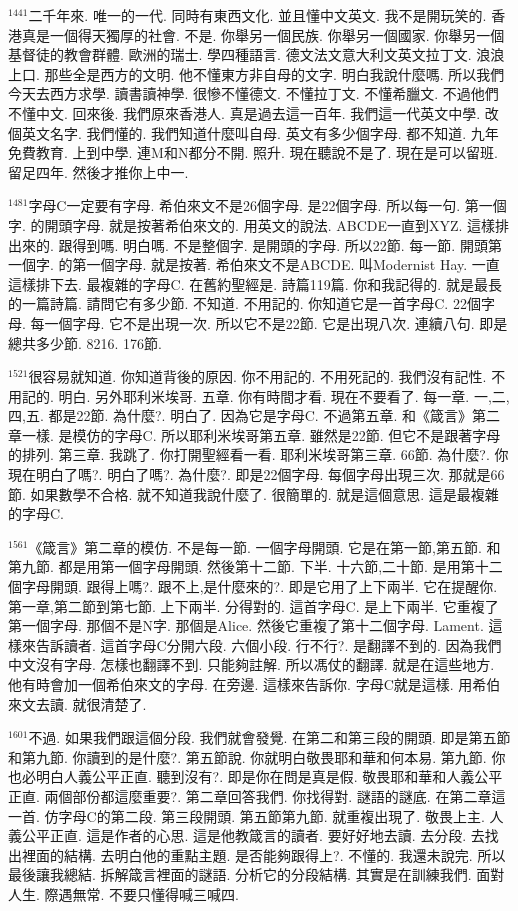 \documentclass{book}
\begin{document}
$^{1441}$二千年來.
唯一的一代.
同時有東西文化.
並且懂中文英文.
我不是開玩笑的.
香港真是一個得天獨厚的社會.
不是.
你舉另一個民族.
你舉另一個國家.
你舉另一個基督徒的教會群體.
歐洲的瑞士.
學四種語言.
德文法文意大利文英文拉丁文.
浪浪上口.
那些全是西方的文明.
他不懂東方非自母的文字.
明白我說什麼嗎.
所以我們今天去西方求學.
讀書讀神學.
很慘不懂德文.
不懂拉丁文.
不懂希臘文.
不過他們不懂中文.
回來後.
我們原來香港人.
真是過去這一百年.
我們這一代英文中學.
改個英文名字.
我們懂的.
我們知道什麼叫自母.
英文有多少個字母.
都不知道.
九年免費教育.
上到中學.
連M和N都分不開.
照升.
現在聽說不是了.
現在是可以留班.
留足四年.
然後才推你上中一.

$^{1481}$字母C一定要有字母.
希伯來文不是26個字母.
是22個字母.
所以每一句.
第一個字.
的開頭字母.
就是按著希伯來文的.
用英文的說法.
ABCDE一直到XYZ.
這樣排出來的.
跟得到嗎.
明白嗎.
不是整個字.
是開頭的字母.
所以22節.
每一節.
開頭第一個字.
的第一個字母.
就是按著.
希伯來文不是ABCDE.
叫Modernist Hay.
一直這樣排下去.
最複雜的字母C.
在舊約聖經是.
詩篇119篇.
你和我記得的.
就是最長的一篇詩篇.
請問它有多少節.
不知道.
不用記的.
你知道它是一首字母C.
22個字母.
每一個字母.
它不是出現一次.
所以它不是22節.
它是出現八次.
連續八句.
即是總共多少節.
8216.
176節.

$^{1521}$很容易就知道.
你知道背後的原因.
你不用記的.
不用死記的.
我們沒有記性.
不用記的.
明白.
另外耶利米埃哥.
五章.
你有時間才看.
現在不要看了.
每一章.
一,二,四,五.
都是22節.
為什麼?.
明白了.
因為它是字母C.
不過第五章.
和《箴言》第二章一樣.
是模仿的字母C.
所以耶利米埃哥第五章.
雖然是22節.
但它不是跟著字母的排列.
第三章.
我跳了.
你打開聖經看一看.
耶利米埃哥第三章.
66節.
為什麼?.
你現在明白了嗎?.
明白了嗎?.
為什麼?.
即是22個字母.
每個字母出現三次.
那就是66節.
如果數學不合格.
就不知道我說什麼了.
很簡單的.
就是這個意思.
這是最複雜的字母C.

$^{1561}$《箴言》第二章的模仿.
不是每一節.
一個字母開頭.
它是在第一節,第五節.
和第九節.
都是用第一個字母開頭.
然後第十二節.
下半.
十六節,二十節.
是用第十二個字母開頭.
跟得上嗎?.
跟不上,是什麼來的?.
即是它用了上下兩半.
它在提醒你.
第一章,第二節到第七節.
上下兩半.
分得對的.
這首字母C.
是上下兩半.
它重複了第一個字母.
那個不是N字.
那個是Alice.
然後它重複了第十二個字母.
Lament.
這樣來告訴讀者.
這首字母C分開六段.
六個小段.
行不行?.
是翻譯不到的.
因為我們中文沒有字母.
怎樣也翻譯不到.
只能夠註解.
所以馮仗的翻譯.
就是在這些地方.
他有時會加一個希伯來文的字母.
在旁邊.
這樣來告訴你.
字母C就是這樣.
用希伯來文去讀.
就很清楚了.

$^{1601}$不過.
如果我們跟這個分段.
我們就會發覺.
在第二和第三段的開頭.
即是第五節和第九節.
你讀到的是什麼?.
第五節說.
你就明白敬畏耶和華和何本易.
第九節.
你也必明白人義公平正直.
聽到沒有?.
即是你在問是真是假.
敬畏耶和華和人義公平正直.
兩個部份都這麼重要?.
第二章回答我們.
你找得對.
謎語的謎底.
在第二章這一首.
仿字母C的第二段.
第三段開頭.
第五節第九節.
就重複出現了.
敬畏上主.
人義公平正直.
這是作者的心思.
這是他教箴言的讀者.
要好好地去讀.
去分段.
去找出裡面的結構.
去明白他的重點主題.
是否能夠跟得上?.
不懂的.
我還未說完.
所以最後讓我總結.
拆解箴言裡面的謎語.
分析它的分段結構.
其實是在訓練我們.
面對人生.
際遇無常.
不要只懂得喊三喊四.
\end{document}
